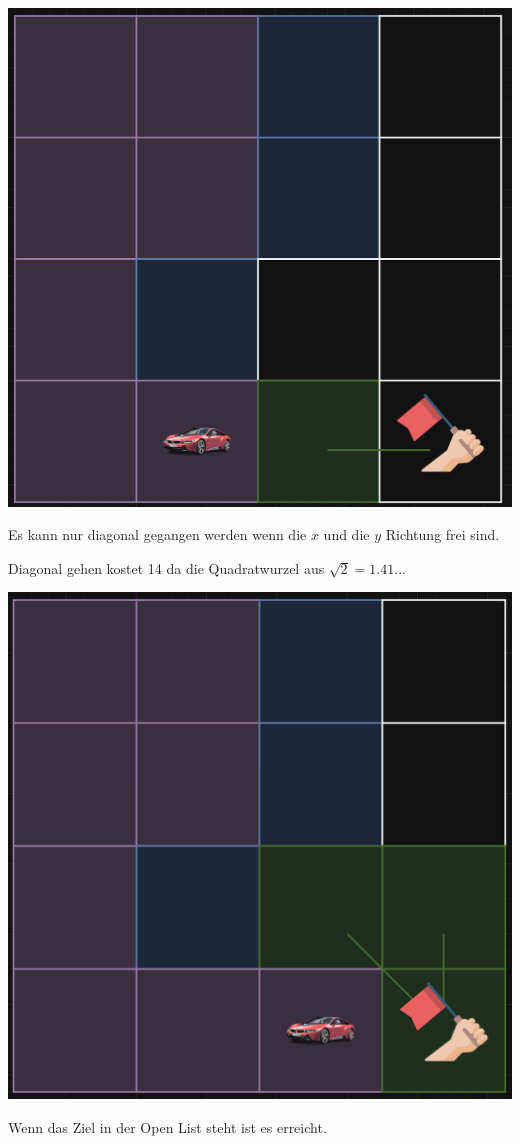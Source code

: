 {
\begin{minipage}{0.4\linewidth}
  \includegraphics[scale=.125]{Cars/img6.png}
\end{minipage}
\begin{minipage}{0.6\linewidth}
Es kann nur diagonal gegangen werden wenn die \(x\) und die \(y\) Richtung frei sind. 

Diagonal gehen kostet 14 da die Quadratwurzel aus
\(\sqrt{2}=1.41...\) 
\end{minipage}
}
{
\begin{minipage}{0.4\linewidth}
  \includegraphics[scale=.125]{Cars/img7.png}
\end{minipage}
\begin{minipage}{0.6\linewidth}
Wenn das Ziel in der Open List steht ist es erreicht.
\end{minipage}
}
